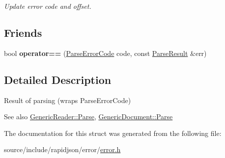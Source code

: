 \begin{DoxyCompactItemize}
\begin{DoxyCompactList}\small\item\em Update error code and offset. \end{DoxyCompactList}\end{DoxyCompactItemize}
\subsection*{Friends}
\begin{DoxyCompactItemize}
\item 
\hypertarget{struct_parse_result_a58c9982e833d1c74686506ac7449200c}{}bool {\bfseries operator==} (\hyperlink{group___r_a_p_i_d_j_s_o_n___e_r_r_o_r_s_ga8d4b32dfc45840bca189ade2bbcb6ba7}{Parse\+Error\+Code} code, const \hyperlink{struct_parse_result}{Parse\+Result} \&err)\label{struct_parse_result_a58c9982e833d1c74686506ac7449200c}

\end{DoxyCompactItemize}


\subsection{Detailed Description}
Result of parsing (wraps Parse\+Error\+Code) 


 \begin{DoxySeeAlso}{See also}
\hyperlink{class_generic_reader_a0c450620d14ff1824e58bb7bd9b42099}{Generic\+Reader\+::\+Parse}, \hyperlink{class_generic_document_aebd4e7fddd80c1e1174837aee6d2159b}{Generic\+Document\+::\+Parse} 
\end{DoxySeeAlso}


The documentation for this struct was generated from the following file\+:\begin{DoxyCompactItemize}
\item 
source/include/rapidjson/error/\hyperlink{error_8h}{error.\+h}\end{DoxyCompactItemize}

